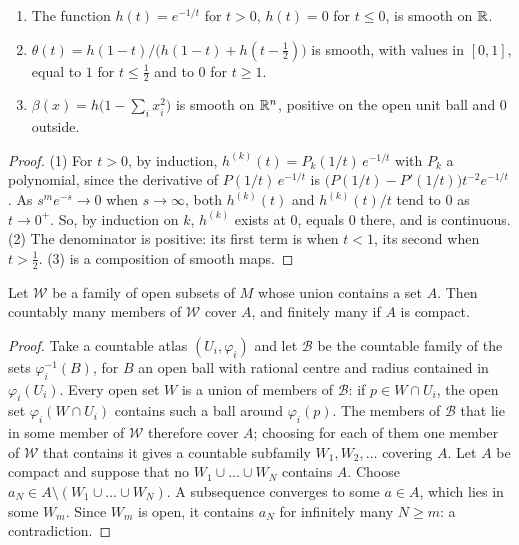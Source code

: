 \begin{notechapter}
\begin{lemma}\label{stokes:lem:step}
\begin{enumerate}[nosep]
  \item The function $h(t) = e^{-1/t}$ for $t > 0$, $h(t) = 0$ for
        $t\leq0$, is smooth on $\mathbb{R}$.
  \item $\theta(t) = h(1 - t)/\bigl(h(1 - t) + h(t - \frac12)\bigr)$ is
        smooth, with values in $[0, 1]$, equal to $1$ for
        $t\leq\frac12$ and to $0$ for $t\geq1$.
  \item $\beta(x) = h\bigl(1 - \sum_ix_i^2\bigr)$ is smooth on $\mathbb{R}^n$,
        positive on the open unit ball and $0$ outside.
\end{enumerate}
\end{lemma}

\begin{proof}
(1) For $t > 0$, by induction, $h^{(k)}(t) = P_k(1/t)\,e^{-1/t}$ with
$P_k$ a polynomial, since the derivative of $P(1/t)\,e^{-1/t}$ is
$\bigl(P(1/t) - P'(1/t)\bigr)t^{-2}e^{-1/t}$. As $s^me^{-s}\to0$ when
$s\to\infty$, both $h^{(k)}(t)$ and $h^{(k)}(t)/t$ tend to $0$ as
$t\to0^+$. So, by induction on $k$, $h^{(k)}$ exists at $0$, equals
$0$ there, and is continuous. (2) The denominator is positive: its
first term is when $t < 1$, its second when $t > \frac12$. (3) is a
composition of smooth maps.
\end{proof}

\begin{lemma}\label{stokes:lem:cover}
Let $\mathcal W$ be a family of open subsets of $M$ whose union
contains a set $A$. Then countably many members of $\mathcal W$ cover
$A$, and finitely many if $A$ is compact.
\end{lemma}

\begin{proof}
Take a countable atlas $(U_i, \varphi_i)$ and let $\mathcal B$ be the
countable family of the sets $\varphi_i^{-1}(B)$, for $B$ an open ball
with rational centre and radius contained in $\varphi_i(U_i)$. Every
open set $W$ is a union of members of $\mathcal B$: if $p\in W\cap U_i$,
the open set $\varphi_i(W\cap U_i)$ contains such a ball around
$\varphi_i(p)$. The members of $\mathcal B$ that lie in some member of
$\mathcal W$ therefore cover $A$; choosing for each of them one member
of $\mathcal W$ that contains it gives a countable subfamily
$W_1, W_2,\dots$ covering $A$. Let $A$ be compact and suppose that no
$W_1\cup\dots\cup W_N$ contains $A$. Choose
$a_N\in A\setminus(W_1\cup\dots\cup W_N)$. A subsequence converges to
some $a\in A$, which lies in some $W_m$. Since $W_m$ is open, it
contains $a_N$ for infinitely many $N\geq m$: a contradiction.
\end{proof}


\end{notechapter}
